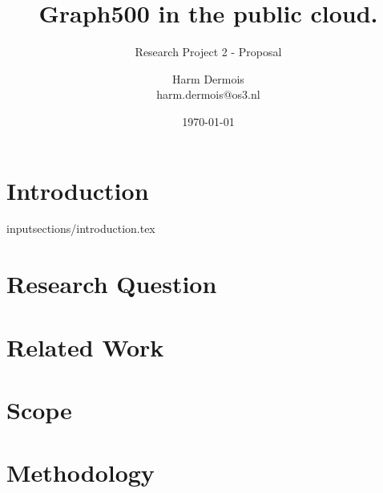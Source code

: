 \documentclass[A4]{scrartcl}
\begin{document}
\title{Graph500 in the public cloud.}
\subtitle{Research Project 2 - Proposal}
\date{\today}
\author{Harm Dermois \\ harm.dermois@os3.nl}

\maketitle
\newpage
\tableofcontents
\newpage

\section{Introduction}
\label{sec:introduction}
input{sections/introduction.tex}


\section{Research Question}



\section{Related Work}



\section{Scope}



\section{Methodology}




\printbibliography
\end{document}
